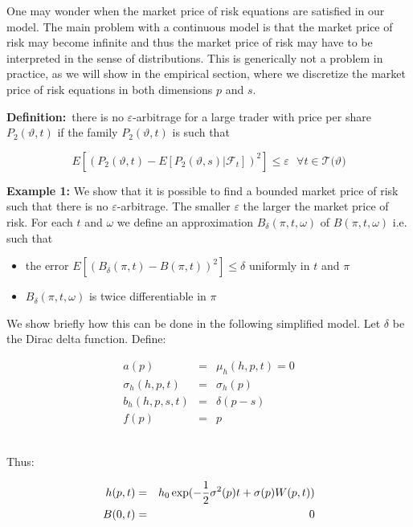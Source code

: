 \documentclass{article}
\begin{document}
\bigskip

One may wonder when the market price of risk equations are satisfied in our
model. The main problem with a continuous model is that the market price of
risk may become infinite and thus the market price of risk may have to be
interpreted in the sense of distributions. This is generically not a problem
in practice, as we will show in the empirical section, where we discretize
the market price of risk equations in both dimensions $p$ and $s$.

\bigskip

\textbf{Definition:}\ there is no $\varepsilon $-arbitrage for a large
trader with price per share $P_{2}(\vartheta ,t)$ if the family $%
P_{2}(\vartheta ,t)$ is such that

\begin{equation*}
E[(P_{2}(\vartheta ,t)-E[P_{2}(\vartheta ,s)|\mathcal{F}_{t}])^{2}]\leq
\varepsilon \text{ \ \ \ }\forall t\in \mathcal{T(}\vartheta )
\end{equation*}

\textbf{Example 1: }We show that it is possible to find a bounded market
price of risk such that there is no $\varepsilon $-arbitrage. The smaller $%
\varepsilon $ the larger the market price of risk. For each $t$ and $\omega $
we define an approximation $B_{\delta }(\pi ,t,\omega )$ of $B(\pi ,t,\omega
)$ i.e. such that

\begin{itemize}
\item the error $E[(B_{\delta }(\pi ,t)-B(\pi ,t))^{2}]\leq \delta $
uniformly in $t$ and $\pi $

\item $B_{\delta }(\pi ,t,\omega )$ is twice differentiable in $\pi $
\end{itemize}

We show briefly how this can be done in the following simplified model. Let $%
\delta $ be the Dirac delta function. Define:

\begin{eqnarray*}
a(p) &=&\mu _{h}(h,p,t)=0 \\
\sigma _{h}(h,p,t) &=&\sigma _{h}(p) \\
b_{h}(h,p,s,t) &=&\delta (p-s) \\
f(p) &=&p
\end{eqnarray*}%
\bigskip\

Thus:

\begin{eqnarray}
h(p,t) &=&h_{0}\exp (-\frac{1}{2}\sigma ^{2}(p)t+\sigma (p)W(p,t))
\label{h_of_p} \\
B(0,t) &=&0  \notag
\end{eqnarray}%
\bigskip
\end{document}
